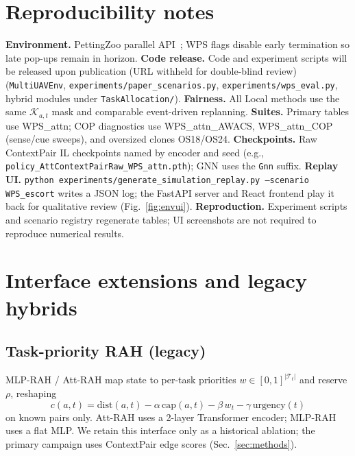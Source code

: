\documentclass[journal,twocolumn,10pt]{IEEEtran}
\begin{document}
\section{Reproducibility notes}
\label{app:repro}
\textbf{Environment.}
PettingZoo parallel API~\cite{terry2021pettingzoo}; WPS flags disable early termination so late pop-ups remain in horizon.
\textbf{Code release.}
Code and experiment scripts will be released upon publication (URL withheld for double-blind review)~\cite{multi_uav_ta_gym}
(\texttt{MultiUAVEnv}, \texttt{experiments/paper\_scenarios.py}, \texttt{experiments/wps\_eval.py}, hybrid modules under \texttt{TaskAllocation/}).
\textbf{Fairness.}
All Local methods use the same \(\mathcal{K}_{a,t}\) mask and comparable event-driven replanning.
\textbf{Suites.}
Primary tables use WPS\_attn; COP diagnostics use WPS\_attn\_AWACS, WPS\_attn\_COP (sense/cue sweeps), and oversized clones OS18/OS24.
\textbf{Checkpoints.}
Raw ContextPair IL checkpoints named by encoder and seed (e.g., \texttt{policy\_AttContextPairRaw\_WPS\_attn.pth}); GNN uses the \texttt{Gnn} suffix.
\textbf{Replay UI.}
\texttt{python experiments/generate\_simulation\_replay.py --scenario WPS\_escort} writes a JSON log; the FastAPI server and React frontend play it back for qualitative review (Fig.~\ref{fig:envui}).
\textbf{Reproduction.}
Experiment scripts and scenario registry regenerate tables; UI screenshots are not required to reproduce numerical results.

\section{Interface extensions and legacy hybrids}
\label{app:ext}
\subsection{Task-priority RAH (legacy)}
MLP-RAH / Att-RAH map state to per-task priorities \(w\in[0,1]^{|\mathcal{T}_t|}\) and reserve \(\rho\), reshaping
\begin{equation}
c(a,t)=\mathrm{dist}(a,t)-\alpha\,\mathrm{cap}(a,t)-\beta\,w_t-\gamma\,\mathrm{urgency}(t)
\label{eq:cost}
\end{equation}
on known pairs only.
Att-RAH uses a 2-layer Transformer encoder; MLP-RAH uses a flat MLP.
We retain this interface only as a historical ablation; the primary campaign uses ContextPair edge scores (Sec.~\ref{sec:methods}).
\end{document}
